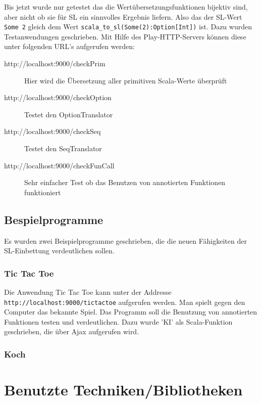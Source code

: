 \documentclass[12pt,bibtotoc]{scrreprt}
\begin{document}
Bis jetzt wurde nur getestet das die Wertübersetzungsfunktionen bijektiv sind, aber nicht ob sie für SL ein sinnvolles Ergebnis liefern. Also das der SL-Wert \lstinline!Some 2! gleich dem Wert \lstinline!scala_to_sl(Some(2):Option[Int])! ist. Dazu wurden Testanwendungen geschrieben. Mit Hilfe des Play-HTTP-Servers können diese unter folgenden URL's aufgerufen werden:

\begin{description}
 \item[http://localhost:9000/checkPrim] Hier wird die Übersetzung aller primitiven Scala-Werte überprüft
 \item[http://localhost:9000/checkOption] Testet den OptionTranslator
 \item[http://localhost:9000/checkSeq] Testet den SeqTranslator
 \item[http://localhost:9000/checkFunCall] Sehr einfacher Test ob das Benutzen von annotierten Funktionen funktioniert
\end{description}

\section{Bespielprogramme}

Es wurden zwei Beispielprogramme geschrieben, die die neuen Fähigkeiten der SL-Einbettung verdeutlichen sollen.

\subsection{Tic Tac Toe}

Die Anwendung Tic Tac Toe kann unter der Addresse \lstinline!http://localhost:9000/tictactoe! aufgerufen werden. Man spielt gegen den Computer das bekannte Spiel. Das Programm soll die Benutzung von annotierten Funktionen testen und verdeutlichen. Dazu wurde 'KI' als Scala-Funktion geschrieben, die über Ajax aufgerufen wird.

\subsection{Koch}


\chapter{Benutzte Techniken/Bibliotheken}
\end{document}
